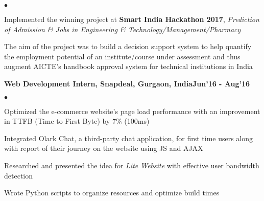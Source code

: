 \documentclass[margin,line]{res}
\newenvironment{list2}{
  \begin{list}{$\bullet$}{%
      \setlength{\itemsep}{0in}
      \setlength{\parsep}{0in} \setlength{\parskip}{0in}
      \setlength{\topsep}{0in} \setlength{\partopsep}{0in}
      \setlength{\leftmargin}{0.2in}}}{\end{list}}
\begin{document}
\begin{resume}
\begin{list2}
  \item Implemented the winning project at {\bf Smart India Hackathon 2017}, {\it Prediction of Admission \& Jobs in Engineering \& Technology/Management/Pharmacy}
  \item The aim of the project was to build a decision support system to help quantify the employment
potential of an institute/course under assessment and thus augment AICTE’s handbook approval system for technical institutions in India
\end{list2}
{\bf Web Development Intern, Snapdeal, Gurgaon, India}\hfill {\bf Jun'16 - Aug'16}

\begin{list2}
  \item Optimized the e-commerce website's page load performance with an improvement in TTFB (Time to First Byte) by 7\% (100ms) 
  \item Integrated Olark Chat, a third-party chat application, for first time users along with report of their journey on the website using JS and AJAX
  \item Researched and presented the idea for {\it Lite Website} with effective user bandwidth detection 
  \item Wrote Python scripts to organize resources and optimize build times
\end{list2}



\end{resume}
\end{document}
